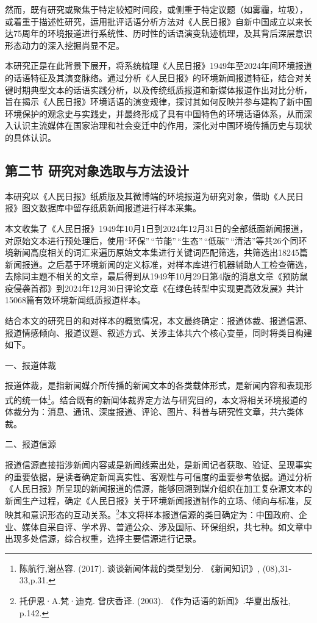 然而，既有研究或聚焦于特定较短时间段，或侧重于特定议题（如雾霾，垃圾），或着重于描述性研究，运用批评话语分析方法对《人民日报》自新中国成立以来长达75周年的环境报道进行系统性、历时性的话语演变轨迹梳理，及其背后深层意识形态动力的深入挖掘尚显不足。

本研究正是在此背景下展开，将系统梳理《人民日报》1949年至2024年间环境报道的话语特征及其演变脉络。通过分析《人民日报》的环境新闻报道特征，结合对关键时期典型文本的话语实践分析，以及传统纸质报道和新媒体报道作出对比分析，旨在揭示《人民日报》环境话语的演变规律，探讨其如何反映并参与建构了新中国环境保护的观念史与实践史，并最终形成了具有中国特色的环境话语体系，从而深入认识主流媒体在国家治理和社会变迁中的作用，深化对中国环境传播历史与现状的具体认识。

\subsection{第二节
研究对象选取与方法设计}\label{ux7b2cux4e8cux8282-ux7814ux7a76ux5bf9ux8c61ux9009ux53d6ux4e0eux65b9ux6cd5ux8bbeux8ba1}

本研究以《人民日报》纸质版及其微博端的环境报道为研究对象，借助《人民日报》图文数据库中留存纸质新闻报道进行样本采集。

本文收集了《人民日报》1949年10月1日到2024年12月31日的全部纸面新闻报道，对原始文本进行预处理后，使用``环保''\,``节能''\,``生态''\,``低碳''\,``清洁''等共26个同环境新闻高度相关的词汇来遍历原始文本集进行关键词匹配筛选，共筛选出18245篇新闻报道。之后基于环境新闻的定义标准，对样本库进行机器辅助人工检查筛选，去除同主题不相关的文章，最后得到从1949年10月29日第4版的消息文章《预防鼠疫侵袭首都》到2024年12月30日评论文章《在绿色转型中实现更高效发展》共计15068篇有效环境新闻纸质报道样本。

结合本文的研究目的和对样本的概览情况，本文最终确定：报道体裁、报道信源、报道情感倾向、报道议题、叙述方式、关涉主体共六个核心变量，同时将类目构建如下。

一、报道体裁

报道体裁，是指新闻媒介所传播的新闻文本的各类载体形式，是新闻内容和表现形式的统一体\footnote{陈航行,谢丛容.
  (2017). 谈谈新闻体裁的类型划分. 《新闻知识》, (08),31-33,p.31.}。结合既有的新闻体裁界定方法与研究目的，本文将相关环境报道的体裁分为：消息、通讯、深度报道、评论、图片、科普与研究性文章，共六类体裁。

二、报道信源

报道信源直接指涉新闻内容或是新闻线索出处，是新闻记者获取、验证、呈现事实的重要依据，是读者确定新闻真实性、客观性与可信度的重要参考依据。通过分析《人民日报》所呈现的新闻报道的信源，能够回溯到媒介组织在加工复杂源文本的新闻生产过程，确定《人民日报》关于环境新闻报道制作的立场、倾向与标准，反映其和意识形态的互动关系。\footnote{托伊恩·A.梵·迪克.
  曾庆香译. (2003). 《作为话语的新闻》.华夏出版社, p.142.}本文将样本报道信源的类目确定为：中国政府、企业、媒体自采自评、学术界、普通公众、涉及国际、环保组织，共七种。如文章中出现多处信源，综合权重，选择主要信源进行记录。

